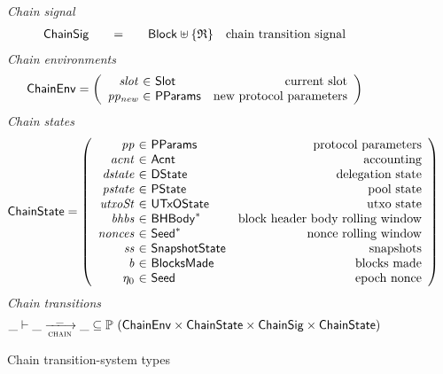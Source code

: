 \begin{figure}[ht]
  \emph{Chain signal}
  \begin{equation*}
    \begin{array}{l@{\qquad=\qquad}lr}
      \ChainSig
      & \Block \uniondistinct \{\mathfrak{R}\}
      & \text{chain transition signal} \\
    \end{array}
  \end{equation*}
  \emph{Chain environments}
  \begin{equation*}
    \ChainEnv =
    \left(
      \begin{array}{r@{~\in~}lr}
        \var{slot} & \Slot & \text{current slot}\\
        \var{pp_{new}} & \PParams & \text{new protocol parameters}\\
      \end{array}
    \right)
  \end{equation*}
  \emph{Chain states}
  \begin{equation*}
    \ChainState =
    \left(
      \begin{array}{r@{~\in~}lr}
        \var{pp} & \PParams & \text{protocol parameters}\\
        \var{acnt} & \Acnt & \text{accounting}\\
        \var{dstate} & \DState & \text{delegation state}\\
        \var{pstate} & \PState & \text{pool state}\\
        \var{utxoSt} & \UTxOState & \text{utxo state}\\
        \var{bhbs} & \seqof{\BHBody} & \text{block header body rolling window}\\
        \var{nonces} & \seqof{\Seed} & \text{nonce rolling window}\\
        \var{ss} & \SnapshotState & \text{snapshots}\\
        \var{b} & \BlocksMade & \text{blocks made}\\
        \eta_0 & \Seed & \text{epoch nonce}\\
      \end{array}
    \right)
  \end{equation*}
  \emph{Chain transitions}
  \begin{equation*}
    \_ \vdash \var{\_} \trans{chain}{\_} \var{\_} \subseteq
    \powerset (\ChainEnv \times \ChainState \times \ChainSig \times \ChainState)
  \end{equation*}
  \caption{Chain transition-system types}
  \label{fig:ts-types:chain}
\end{figure}

